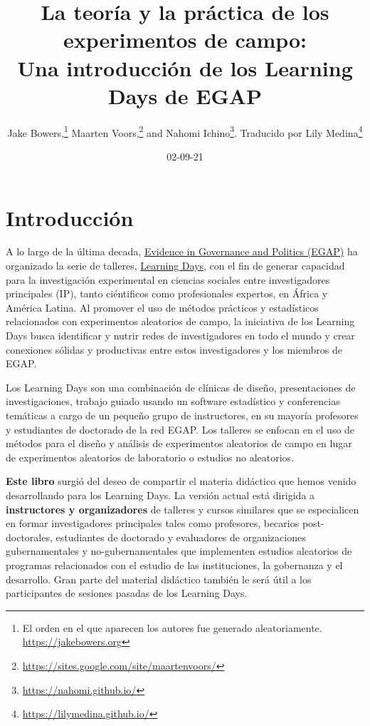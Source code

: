 \documentclass[12pt,spanish,]{book}
\title{La teoría y la práctica de los experimentos de campo:\\
Una introducción de los Learning Days de EGAP}
\author{Jake Bowers,\footnote{El orden en el que aparecen los autores fue generado aleatoriamente. \url{https://jakebowers.org}} Maarten Voors,\footnote{\url{https://sites.google.com/site/maartenvoors/}} and Nahomi Ichino\footnote{\url{https://nahomi.github.io/}}. Traducido por Lily Medina\footnote{\url{https://lilymedina.github.io/}}}
\date{02-09-21}
\begin{document}
\maketitle

\captionsetup[table]{list=no}
\captionsetup[figure]{list=no}

{
\hypersetup{linkcolor=}
\setcounter{tocdepth}{1}
\tableofcontents
}
\hypertarget{introducciuxf3n}{%
\chapter{Introducción}\label{introducciuxf3n}}

A lo largo de la última decada, \href{http://egap.org/}{Evidence in Governance and Politics (EGAP)} ha organizado la serie de talleres, \href{https://egap.org/learning-days/}{Learning Days}, con el fin de generar capacidad para la investigación experimental en ciencias sociales entre investigadores principales (IP), tanto ciéntificos como profesionales expertos, en África y América Latina. Al promover el uso de métodos prácticos y estadísticos relacionados con experimentos aleatorios de campo, la iniciativa de los Learning Days busca identificar y nutrir redes de investigadores en todo el mundo y crear conexiones sólidas y productivas entre estos investigadores y los miembros de EGAP.

Los Learning Days son una combinación de clínicas de diseño, presentaciones de investigaciones, trabajo guiado usando un software estadístico y conferencias temáticas a cargo de un pequeño grupo de instructores, en su mayoría profesores y estudiantes de doctorado de la red EGAP. Los talleres se enfocan en el uso de métodos para el diseño y análisis de experimentos aleatorios de campo en lugar de experimentos aleatorios de laboratorio o estudios no aleatorios.

\textbf{Este libro} surgió del deseo de compartir el materia didáctico que hemos venido desarrollando para los Learning Days. La versión actual está dirigida a \textbf{instructores y organizadores} de talleres y cursos similares que se especialicen en formar investigadores principales tales como profesores, becarios post-doctorales, estudiantes de doctorado y evaluadores de organizaciones gubernamentales y no-gubernamentales que implementen estudios aleatorios de programas relacionados con el estudio de las instituciones, la gobernanza y el desarrollo. Gran parte del material didáctico también le será útil a los participantes de sesiones pasadas de los Learning Days.
\end{document}
